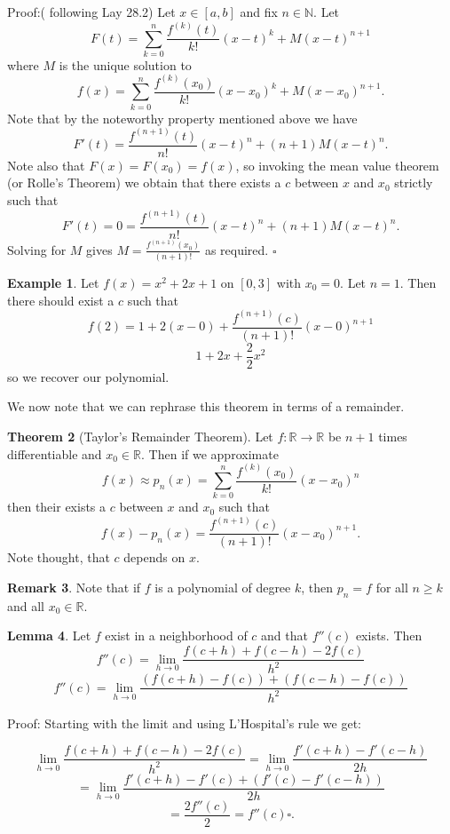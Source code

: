 \documentclass[12pt]{article}
\theoremstyle{definition}
\newtheorem{thm}{Theorem}
\newtheorem{lem}[thm]{Lemma}
\newtheorem{rem}[thm]{Remark}
\newtheorem{ex}[thm]{Example}
\def\N{{\mathbb N}}
\def\R{{\mathbb R}}
\begin{document}
Proof:( following Lay 28.2)
Let $ x\in [a,b]$ and fix $ n\in \N $. Let
$$F(t)= \sum_{k=0}^{n} \frac{f^{(k)}(t)}{k!}(x-t)^k + M(x-t)^{n+1}$$ 
where $M$ is the unique solution to 
$$ f(x)= \sum_{k=0}^{n} \frac{f^{(k)}(x_0)}{k!} (x-x_0)^k +M(x-x_0)^{n+1}.  $$ 
Note that by the noteworthy property mentioned above we have
$$ F'(t)= \frac{f^{(n+1)}(t)}{n!}(x-t)^n + (n+1)M(x-t)^n.$$ 
Note also that $F(x)=F(x_0)=f(x)$, so invoking the mean value theorem (or Rolle's Theorem) we obtain that there exists a $ c $ between $x$ and $ x_0 $ strictly such that
$$ F'(t)=0=\frac{f^{(n+1)}(t)}{n!}(x-t)^n + (n+1)M(x-t)^n.$$ 
Solving for $M$ gives $M= \frac{f^{(n+1)}(x_0)}{(n+1)!}$ as required. $\square$

\begin{ex}
    Let $f(x)=x^2+2x+1$ on $ [0,3] $ with $x_0=0$. Let $n=1$. Then there should exist a $c$ such that $$ f(2)=1+2(x-0)+ \frac{f^{(n+1)}(c)}{(n+1)!}(x-0)^{n+1}
$$ 
$$ 1+2x+ \frac{2}{2}x^2$$ 
so we recover our polynomial.
\end{ex}

We now note that we can rephrase this theorem in terms of a remainder.

\begin{thm}[Taylor's Remainder Theorem]
    Let $f:\R\to \R$ be $n+1$ times differentiable and $x_0\in \R$. Then if we approximate
$$ f(x)\approx p_n(x) = \sum_{k=0}^{n} \frac{f^{(k)}(x_0)}{k!}(x-x_0)^n  $$ 
    then their exists a $c$ between $ x $ and $ x_0 $ such that
   $$ f(x)-p_n(x)= \frac{f^{(n+1)}(c)}{(n+1)!}(x-x_0)^{n+1}.$$ 
   Note thought, that $ c $ depends on $ x $.
\end{thm}

\begin{rem}
Note that if $f$ is a polynomial of degree $k$, then $p_n=f$ for all $n\geq k$ and all $x_0\in \R$.
\end{rem}

\begin{lem}
    Let $f$ exist in a neighborhood of $c$ and that $f''(c)$ exists. Then $$ f''(c)= \lim \limits_{h\to 0} \frac{f(c+h)+f(c-h)-2f(c)}{h^2} $$ 
    $$  f''(c)= \lim \limits_{h\to 0} \frac{(f(c+h)-f(c))+(f(c-h)-f(c))}{h^2}$$ 
\end{lem}

Proof: Starting with the limit and using L'Hospital's rule we get:

    $$  \lim \limits_{h\to 0} \frac{f(c+h)+f(c-h)-2f(c)}{h^2}=  \lim \limits_{h\to 0} \frac{f'(c+h)-f'(c-h)}{2h}$$ 
    $$ =\lim_{h \to 0} \frac{f'(c+h)-f'(c)+ (f'(c)-f'(c-h))}{2h} $$ 
    $$ = \frac{2f''(c)}{2} = f''(c)  \square.$$ 
\end{document}
